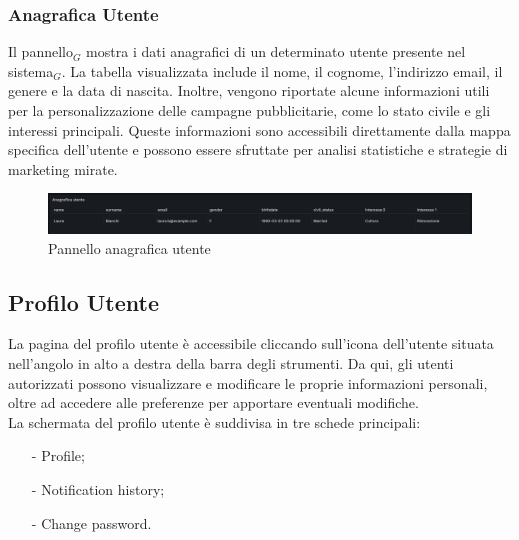 \documentclass[10pt]{article}
\begin{document}
\begin{justify}
    \subsubsection{Anagrafica Utente}
    Il pannello$_G$ mostra i dati anagrafici di un determinato utente presente nel sistema$_G$. La tabella visualizzata include il nome, il cognome, l'indirizzo email, il genere e la data di nascita. Inoltre, vengono riportate alcune informazioni utili per la personalizzazione delle campagne pubblicitarie, come lo stato civile e gli interessi principali. Queste informazioni sono accessibili direttamente dalla mappa specifica dell'utente e possono essere sfruttate per analisi statistiche e strategie di marketing mirate.  
    \begin{figure}[H]
    \centering
    \includegraphics[width=1\linewidth]{anagrafica.png}
    \caption{Pannello anagrafica utente}
    \end{figure}



\subsection{Profilo Utente}
La pagina del profilo utente è accessibile cliccando sull'icona dell'utente situata nell'angolo in alto a destra della barra degli strumenti. Da qui, gli utenti autorizzati possono visualizzare e modificare le proprie informazioni personali, oltre ad accedere alle preferenze per apportare eventuali modifiche.\\
La schermata del profilo utente è suddivisa in tre schede principali:  
\begin{itemize}  
    \item[-] Profile; 
    \item[-] Notification history; 
    \item[-] Change password.  
\end{itemize}
    

\end{justify}
\end{document}
